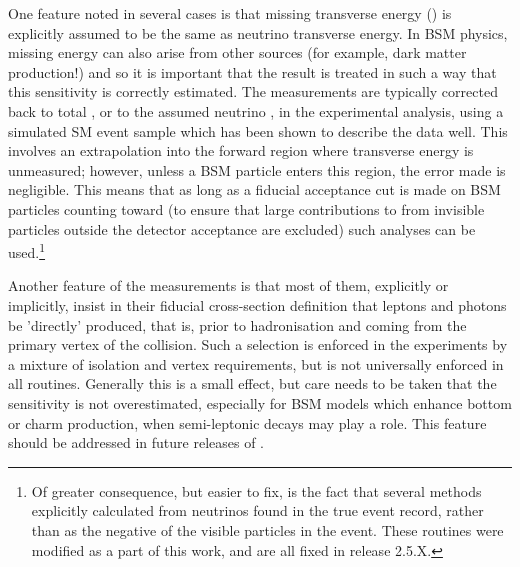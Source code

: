 \documentclass[floatfix]{article}
\begin{document}
One feature noted in several cases is that missing transverse energy (\MET) is 
explicitly assumed to be the same as neutrino transverse energy. In BSM physics, missing energy can also 
arise from other sources (for example, dark matter production!) and so it is important that the result is treated in such a 
way that this sensitivity is correctly estimated. The measurements are typically corrected back to total \MET, 
or to the assumed neutrino \pt, in the experimental analysis, using a simulated SM event sample which has been shown to describe
the data well. This involves an extrapolation into the forward 
region where transverse energy is unmeasured; however, unless a BSM particle enters this region, the error made is 
negligible. This means that as long as a fiducial acceptance cut is made on BSM particles counting toward \MET (to ensure that 
large contributions to \MET 
from invisible particles outside the detector acceptance are excluded) such analyses can be 
used.\footnote{Of greater consequence, but easier to fix, is the fact that several \rivet methods explicitly calculated \MET
from neutrinos found in the true event record, rather than as the negative of the visible particles in the event. These 
routines were modified as a part of this work, and are all fixed in release 2.5.X.} 

Another feature of the measurements is that most of them, explicitly or implicitly, insist in their fiducial cross-section definition 
that leptons and photons be 'directly' produced, that is, prior to hadronisation  and coming from the primary vertex of the collision. 
Such a selection is enforced in the experiments by a mixture of isolation and vertex requirements, but is not universally enforced
in all \rivet routines. Generally this is a small effect, but care needs to be taken that the sensitivity is not overestimated, especially
for BSM models which enhance bottom or charm production, when semi-leptonic decays may play a role.
This feature should be addressed in future releases of \rivet.
\end{document}
